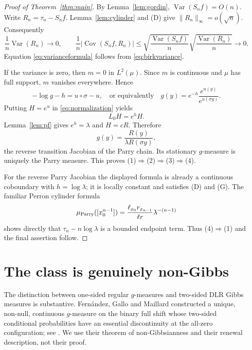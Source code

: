 \documentclass[11pt]{article}
\theoremstyle{definition}
\theoremstyle{remark}
\newcommand{\Var}{\operatorname{Var}}
\begin{document}
\begin{proof}[Proof of Theorem~\ref{thm:main}]
By Lemma~\ref{lem:gordin}, $\Var(S_nf)=O(n)$.  Write
$R_n=\tau_n-S_nf$.  Lemma~\ref{lem:cylinder} and (D) give
$\|R_n\|_\infty=o(\sqrt n)$.  Consequently
\[
 \frac1n\Var(R_n)\longrightarrow0,
 \qquad
 \frac1n|\operatorname{Cov}(S_nf,R_n)|
 \le \sqrt{\frac{\Var(S_nf)}n}
       \sqrt{\frac{\Var(R_n)}n}\longrightarrow0.
\]
Equation \eqref{eq:varianceformula} follows from
\eqref{eq:birkvariance}.

If the variance is zero, then $m=0$ in $L^2(\mu)$.  Since $m$ is
continuous and $\mu$ has full support, $m$ vanishes everywhere.  Hence
\begin{equation}\label{eq:cohomology}
 -\log g-h=u\circ\sigma-u,
 \quad\text{or equivalently}\quad
 g(y)=e^{-h}\frac{e^{u(y)}}{e^{u(\sigma y)}}.
\end{equation}
Putting $H=e^u$ in \eqref{eq:normalization} yields
\[
 L_0H=e^hH.
\]
Lemma~\ref{lem:pf} gives $e^h=\lambda$ and $H=cR$.  Therefore
\[
 g(y)=\frac{R(y)}{\lambda R(\sigma y)},
\]
the reverse transition Jacobian of the Parry chain.  Its stationary
$g$-measure is uniquely the Parry measure.  This proves
(1)$\Rightarrow$(2)$\Rightarrow$(3)$\Rightarrow$(4).

For the reverse Parry Jacobian the displayed formula is already a
continuous coboundary with $h=\log\lambda$; it is locally constant and
satisfies (D) and (G).  The familiar Perron cylinder formula
\[
 \mu_{\rm Parry}([x_0^{n-1}])
 =\frac{\ell_{x_0}r_{x_{n-1}}}{\ell r}\lambda^{-(n-1)}
\]
shows directly that $\tau_n-n\log\lambda$ is a bounded endpoint term.
Thus (4)$\Rightarrow$(1) and the final assertion follow.
\end{proof}

\section{The class is genuinely non-Gibbs}

The distinction between one-sided regular $g$-measures and two-sided DLR
Gibbs measures is substantive.  Fern\'andez, Gallo and Maillard
constructed a unique, non-null, continuous $g$-measure on the binary full
shift whose two-sided conditional probabilities have an essential
discontinuity at the all-zero configuration; see
\cite{FGM2011}.  We use their theorem of non-Gibbsianness and their renewal
description, not their proof.
\end{document}
